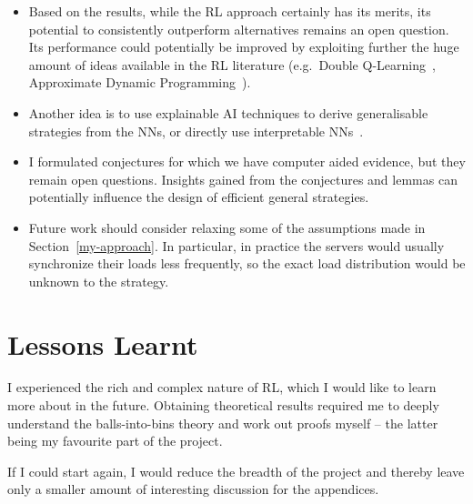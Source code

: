 \begin{itemize}
    \item Based on the results, while the RL approach certainly has its merits, its potential to consistently outperform alternatives remains an open question. Its performance could potentially be improved by exploiting further the huge amount of ideas available in the RL literature (e.g.\ Double Q-Learning~\cite{hasselt2010doubleqlearning}, Approximate Dynamic Programming~\cite{bellman1959approximatedp}).
    \item Another idea is to use explainable AI techniques to derive generalisable strategies from the NNs, or directly use interpretable NNs~\cite{vacareanu2022explainableAI1, tang2022explainableAI2}.
    \item I formulated conjectures for which we have computer aided evidence, but they remain open questions. Insights gained from the conjectures and lemmas can potentially influence the design of efficient general strategies.
    \item Future work should consider relaxing some of the assumptions made in Section~\ref{my-approach}. In particular, in practice the servers would usually synchronize their loads less frequently, so the exact load distribution would be unknown to the strategy.
\end{itemize}



\section{Lessons Learnt}

I experienced the rich and complex nature of RL, which I would like to learn more about in the future. Obtaining theoretical results required me to deeply understand the balls-into-bins theory and work out proofs myself -- the latter being my favourite part of the project.

If I could start again, I would reduce the breadth of the project and thereby leave only a smaller amount of interesting discussion for the appendices.

